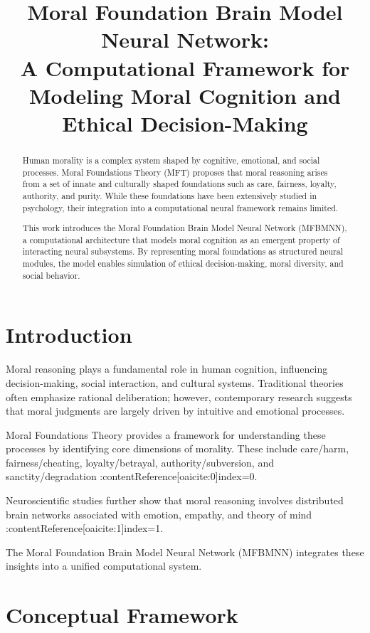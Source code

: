 \documentclass[12pt]{article}
\title{\textbf{Moral Foundation Brain Model Neural Network: \\ A Computational Framework for Modeling Moral Cognition and Ethical Decision-Making}}
\author{}
\date{}
\begin{document}
\maketitle

\begin{abstract}
Human morality is a complex system shaped by cognitive, emotional, and social processes. Moral Foundations Theory (MFT) proposes that moral reasoning arises from a set of innate and culturally shaped foundations such as care, fairness, loyalty, authority, and purity. While these foundations have been extensively studied in psychology, their integration into a computational neural framework remains limited.

This work introduces the Moral Foundation Brain Model Neural Network (MFBMNN), a computational architecture that models moral cognition as an emergent property of interacting neural subsystems. By representing moral foundations as structured neural modules, the model enables simulation of ethical decision-making, moral diversity, and social behavior.
\end{abstract}

\section{Introduction}

Moral reasoning plays a fundamental role in human cognition, influencing decision-making, social interaction, and cultural systems. Traditional theories often emphasize rational deliberation; however, contemporary research suggests that moral judgments are largely driven by intuitive and emotional processes.

Moral Foundations Theory provides a framework for understanding these processes by identifying core dimensions of morality. These include care/harm, fairness/cheating, loyalty/betrayal, authority/subversion, and sanctity/degradation :contentReference[oaicite:0]{index=0}.

Neuroscientific studies further show that moral reasoning involves distributed brain networks associated with emotion, empathy, and theory of mind :contentReference[oaicite:1]{index=1}.

The Moral Foundation Brain Model Neural Network (MFBMNN) integrates these insights into a unified computational system.

\section{Conceptual Framework}
\end{document}
